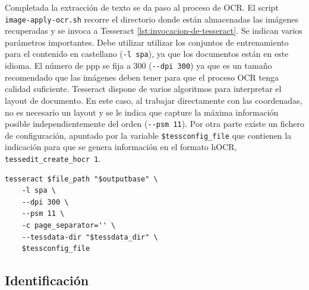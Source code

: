 Completada la extracción de texto se da paso al proceso de OCR. El script \verb|image-apply-ocr.sh| recorre el directorio donde están almacenadas las imágenes recuperadas y se invoca a Tesseract \ref{lst:invocacion-de-tesseract}.  Se indican varios parámetros importantes. Debe utilizar utilizar los conjuntos de entrenamiento para el contenido en castellano (\verb|-l spa|), ya que los documentos están en este idioma. El número de \acrlong{ppp} se fija a 300 (\verb|--dpi 300|) ya que es un tamaño recomendado que las imágenes deben tener para que el proceso OCR tenga calidad suficiente. Tesseract dispone de varios algoritmos para interpretar el layout de documento. En este caso, al trabajar directamente con las coordenadas, no es necesario un layout y se le indica que capture la máxima información posible independientemente del orden (\verb|--psm 11|). Por otra parte existe un fichero de configuración, apuntado por la variable \verb|$tessconfig_file| que contienen la indicación para que se genera información en el formato hOCR, \verb|tessedit_create_hocr 1|.

\begin{lstlisting}[language=XML,caption={Extracción de texto con información de coordenadas},label=lst:invocacion-de-tesseract]
tesseract $file_path "$outputbase" \
    -l spa \
    --dpi 300 \
    --psm 11 \
    -c page_separator='' \
    --tessdata-dir "$tessdata_dir" \
    $tessconfig_file
\end{lstlisting}




\subsection{Identificación}


